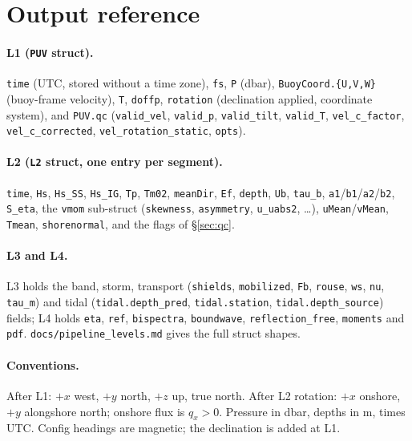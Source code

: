 \documentclass[11pt]{article}
\newcommand{\code}[1]{\texttt{#1}}
\begin{document}
\section{Output reference}
\label{sec:outputs}

\paragraph{L1 (\code{PUV} struct).} \code{time} (UTC, stored without a time zone), \code{fs},
\code{P} (dbar), \code{BuoyCoord.\{U,V,W\}} (buoy-frame velocity), \code{T}, \code{doffp},
\code{rotation} (declination applied, coordinate system), and \code{PUV.qc} (\code{valid\_vel},
\code{valid\_p}, \code{valid\_tilt}, \code{valid\_T}, \code{vel\_c\_factor},
\code{vel\_c\_corrected}, \code{vel\_rotation\_static}, \code{opts}).

\paragraph{L2 (\code{L2} struct, one entry per segment).} \code{time}, \code{Hs}, \code{Hs\_SS},
\code{Hs\_IG}, \code{Tp}, \code{Tm02}, \code{meanDir}, \code{Ef}, \code{depth}, \code{Ub},
\code{tau\_b}, \code{a1}/\code{b1}/\code{a2}/\code{b2}, \code{S\_eta}, the \code{vmom} sub-struct
(\code{skewness}, \code{asymmetry}, \code{u\_uabs2}, \dots), \code{uMean}/\code{vMean},
\code{Tmean}, \code{shorenormal}, and the flags of \S\ref{sec:qc}.

\paragraph{L3 and L4.} L3 holds the band, storm, transport (\code{shields}, \code{mobilized},
\code{Fb}, \code{rouse}, \code{ws}, \code{nu}, \code{tau\_m}) and tidal (\code{tidal.depth\_pred},
\code{tidal.station}, \code{tidal.depth\_source}) fields; L4 holds \code{eta}, \code{ref},
\code{bispectra}, \code{boundwave}, \code{reflection\_free}, \code{moments} and \code{pdf}.
\code{docs/pipeline\_levels.md} gives the full struct shapes.

\paragraph{Conventions.} After L1: $+x$ west, $+y$ north, $+z$ up, true north. After L2
rotation: $+x$ onshore, $+y$ alongshore north; onshore flux is $q_x > 0$. Pressure in dbar,
depths in m, times UTC. Config headings are magnetic; the declination is added at L1.
\end{document}
